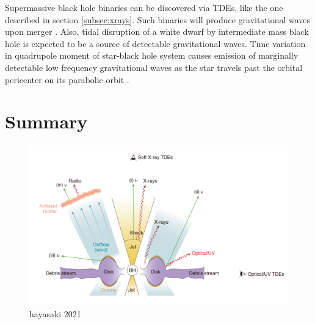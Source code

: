 \documentclass{tda}
\begin{document}
Supermassive black hole binaries can be discovered via TDEs, like the one described in section \ref{subsec:xrays}. Such binaries will produce gravitational waves upon merger \cite{komossa_tidal_2015}. Also, tidal disruption of a white dwarf by intermediate mass black hole is expected to be a source of detectable gravitational waves. Time variation in quadrupole moment of star-black hole system causes emission of marginally detectable low frequency gravitational waves as the star travels past the orbital pericenter on its parabolic orbit \cite{kobayashi_gravitational_2004, nicholas_chamberlain_stone_tidal_2013}.  

\section{Summary}



\begin{figure} [h]
	\centering
	\includegraphics[width=.75\linewidth]{./images/hayasaki2021.png}
	\caption{hayasaki 2021}
\end{figure}


\clearpage
\printbibliography
\end{document}
